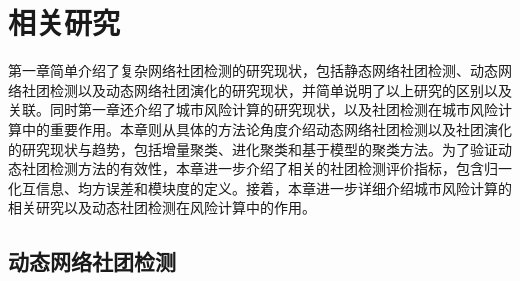 
\chapter{相关研究}
第一章简单介绍了复杂网络社团检测的研究现状，包括静态网络社团检测、动态网络社团检测以及动态网络社团演化的研究现状，并简单说明了以上研究的区别以及关联。同时第一章还介绍了城市风险计算的研究现状，以及社团检测在城市风险计算中的重要作用。本章则从具体的方法论角度介绍动态网络社团检测以及社团演化的研究现状与趋势，包括增量聚类、进化聚类和基于模型的聚类方法。为了验证动态社团检测方法的有效性，本章进一步介绍了相关的社团检测评价指标，包含归一化互信息、均方误差和模块度的定义。接着，本章进一步详细介绍城市风险计算的相关研究以及动态社团检测在风险计算中的作用。
\section{动态网络社团检测}

